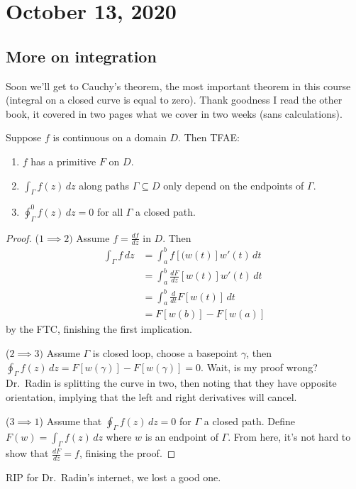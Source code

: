 \section{October 13, 2020}
\subsection{More on integration}
Soon we'll get to Cauchy's theorem, the most important theorem in this course (integral on a closed curve is equal to zero). Thank goodness I read the other book, it covered in two pages what we cover in two weeks (sans calculations).
\begin{theorem}\label{int}
   Suppose $f$ is continuous on a domain $D$. Then TFAE:
   \begin{enumerate}
       \item $f$ has a primitive $F$ on $D$.
       \item $\int_{\Gamma }^{} f(z) \, dz$ along paths $\Gamma \subseteq D$ only depend on the endpoints of $\Gamma $.
       \item $\oint_{\Gamma }^{0} f(z) \, dz=0$ for all $\Gamma$ a closed path.
   \end{enumerate}
\end{theorem}
\begin{proof}
    ($1\implies 2) $ Assume $f=\frac{df}{dz}$ in $D$. Then
    \begin{align*}
        \int_{\Gamma }^{} f \, dz&=\int_{a}^{b} f[(w(t)]w'(t) \, dt\\
                                 &=\int_{a}^{b} \frac{dF}{dz}[w(t)]w'(t) \, dt\\
                                 &=\int_{a}^{b} \frac{d}{dt}F[w(t)] \, dt\\
                                 &=F[w(b)]-F[w(a)]
    \end{align*} by the FTC, finishing the first implication.

    ($2\implies 3)$ Assume $\Gamma $ is closed loop, choose a basepoint $\gamma$, then $\oint_{\Gamma }f(z)\,dz=F[w(\gamma)]-F[w(\gamma)]=0$. Wait, is my proof wrong? Dr.\ Radin is splitting the curve in two, then noting that they have opposite orientation, implying that the left and right derivatives will cancel.

    ($3\implies 1$) Assume that $\oint_{\Gamma }f(z)\,dz=0$ for $\Gamma $ a closed path. Define $F(w)=\int_{\Gamma }^{} f(z) \, dz$ where $w$ is an endpoint of $\Gamma $. From here, it's not hard to show that $\frac{dF}{dz}=f$, finising the proof.
\end{proof}
RIP for Dr.\ Radin's internet, we lost a good one.

